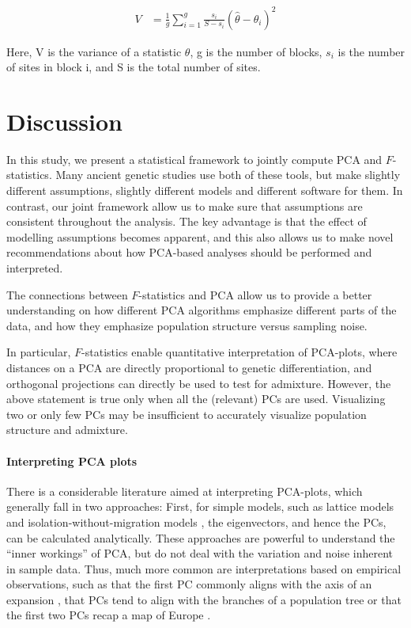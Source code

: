 \documentclass[12pt, letterpaper]{article}
\begin{document}
\begin{align}\label{eq:bjk_var}
V &= \frac{1}{g} \sum_{i=1}^g \frac{s_i}{S-s_i} (\hat{\theta} - \theta_i)^2
\end{align}

Here, V is the variance of a statistic $\theta$, g is the number of blocks, $s_i$ is the number of sites in block i, and S is the total number of sites.


\section{Discussion}
In this study, we present a statistical framework to jointly compute PCA and $F$-statistics. Many ancient genetic studies use both of these tools, but make slightly different assumptions, slightly different models and different software for them. In contrast, our joint framework allow us to make sure that assumptions are consistent throughout the analysis. The key advantage is that the effect of modelling assumptions becomes apparent, and this also allows us to make novel recommendations about how PCA-based analyses should be performed and interpreted.

The connections between $F$-statistics and PCA allow us to provide a better understanding on how different PCA algorithms emphasize different parts of the data, and how they emphasize population structure versus sampling noise.

In particular, $F$-statistics enable quantitative interpretation of PCA-plots, where distances on a PCA are directly proportional to genetic differentiation, and orthogonal projections can directly be used to test for admixture.
However, the above statement is true only when all the (relevant) PCs are used. Visualizing two or only few PCs may be insufficient to accurately visualize population structure and admixture. 

\paragraph{Interpreting PCA plots}
There is a considerable literature aimed at interpreting PCA-plots, which generally fall in two approaches: First, for simple models, such as lattice models \cite{novembre_interpreting_2008} and isolation-without-migration models \cite{mcvean_genealogical_2009}, the eigenvectors, and hence the PCs, can be calculated analytically. These approaches are powerful to understand the ``inner workings'' of PCA, but do not deal with the variation and noise inherent in sample data. Thus, much more common are interpretations based on empirical observations, such as that the first PC commonly aligns with the axis of an expansion \cite{l_l_cavalli-sforza_history_1996}, that PCs tend to align with the branches of a population tree or that the first two PCs recap a map of Europe \citep{novembre_genes_2008, cavalli-sforza_analysis_1975}.
\end{document}
